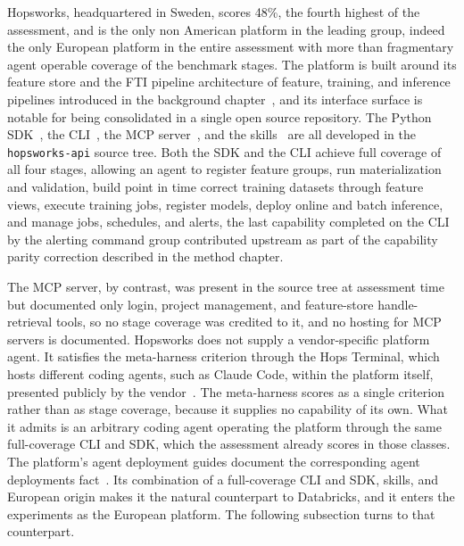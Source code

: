 \documentclass[
english,                 %
bibtex,                  %
]{kththesis}
\numberwithin{listing}{chapter}
\begin{document}
Hopsworks, headquartered in Sweden, scores 48\%, the fourth highest of the assessment, and is the only non American platform in the leading group, indeed the only European platform in the entire assessment with more than fragmentary agent operable coverage of the benchmark stages. The platform is built around its feature store and the \gls{FTI} pipeline architecture of feature, training, and inference pipelines introduced in the background chapter~\cite{de_la_rua_martinez_hopsworks_2024, jim_dowling_building_2025}, and its interface surface is notable for being consolidated in a single open source repository. The Python \gls{SDK}~\cite{hopsworks_ab_logicalclockshopsworks-api_2026}, the \gls{CLI}~\cite{hopsworks_ab_logicalclockshopsworks-apitreemainpythonhopsworkscli_2026}, the \gls{MCP} server~\cite{hopsworks_ab_logicalclockshopsworks-apitreemainpythonhopsworksmcp_2026}, and the skills~\cite{hopsworks_ab_logicalclockshopsworks-apitreemainskills_2026} are all developed in the \texttt{hopsworks-api} source tree. Both the \gls{SDK} and the \gls{CLI} achieve full coverage of all four stages, allowing an agent to register feature groups, run materialization and validation, build point in time correct training datasets through feature views, execute training jobs, register models, deploy online and batch inference, and manage jobs, schedules, and alerts, the last capability completed on the \gls{CLI} by the alerting command group contributed upstream as part of the capability parity correction described in the method chapter.

The \gls{MCP} server, by contrast, was present in the source tree at assessment time but documented only login, project management, and feature-store handle-retrieval tools, so no stage coverage was credited to it, and no hosting for \gls{MCP} servers is documented. Hopsworks does not supply a vendor-specific platform agent. It satisfies the meta-harness criterion through the Hops Terminal, which hosts different coding agents, such as Claude Code, within the platform itself, presented publicly by the vendor~\cite{avstreikh_machine_2026}. The meta-harness scores as a single criterion rather than as stage coverage, because it supplies no capability of its own. What it admits is an arbitrary coding agent operating the platform through the same full-coverage \gls{CLI} and \gls{SDK}, which the assessment already scores in those classes. The platform's agent deployment guides document the corresponding agent deployments fact~\cite{hopsworks_ab_hopsworks_2026}. Its combination of a full-coverage \gls{CLI} and \gls{SDK}, skills, and European origin makes it the natural counterpart to Databricks, and it enters the experiments as the European platform. The following subsection turns to that counterpart.
\end{document}
